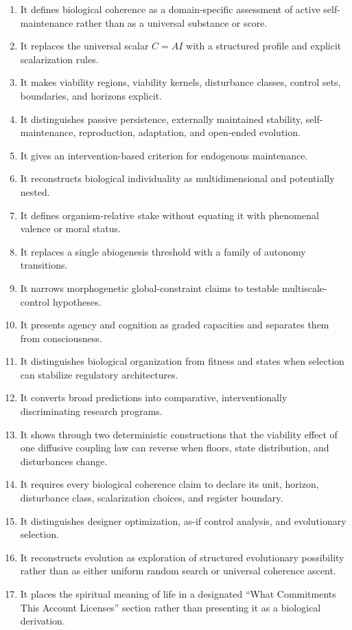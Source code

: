 \documentclass[
  11pt,
]{article}
\providecommand{\tightlist}{%
  \setlength{\itemsep}{0pt}\setlength{\parskip}{0pt}}
\begin{document}
\begin{enumerate}
\def\labelenumi{\arabic{enumi}.}
\tightlist
\item
  It defines biological coherence as a domain-specific assessment of
  active self-maintenance rather than as a universal substance or score.
\item
  It replaces the universal scalar \(C=A I\) with a structured profile
  and explicit scalarization rules.
\item
  It makes viability regions, viability kernels, disturbance classes,
  control sets, boundaries, and horizons explicit.
\item
  It distinguishes passive persistence, externally maintained stability,
  self-maintenance, reproduction, adaptation, and open-ended evolution.
\item
  It gives an intervention-based criterion for endogenous maintenance.
\item
  It reconstructs biological individuality as multidimensional and
  potentially nested.
\item
  It defines organism-relative stake without equating it with phenomenal
  valence or moral status.
\item
  It replaces a single abiogenesis threshold with a family of autonomy
  transitions.
\item
  It narrows morphogenetic global-constraint claims to testable
  multiscale-control hypotheses.
\item
  It presents agency and cognition as graded capacities and separates
  them from consciousness.
\item
  It distinguishes biological organization from fitness and states when
  selection can stabilize regulatory architectures.
\item
  It converts broad predictions into comparative, interventionally
  discriminating research programs.
\item
  It shows through two deterministic constructions that the viability
  effect of one diffusive coupling law can reverse when floors, state
  distribution, and disturbances change.
\item
  It requires every biological coherence claim to declare its unit,
  horizon, disturbance class, scalarization choices, and register
  boundary.
\item
  It distinguishes designer optimization, as-if control analysis, and
  evolutionary selection.
\item
  It reconstructs evolution as exploration of structured evolutionary
  possibility rather than as either uniform random search or universal
  coherence ascent.
\item
  It places the spiritual meaning of life in a designated ``What
  Commitments This Account Licenses'' section rather than presenting it
  as a biological derivation.
\end{enumerate}
\end{document}
